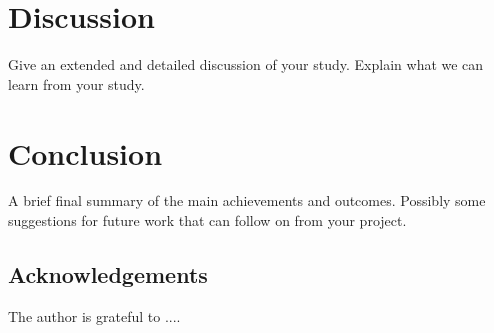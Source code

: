 \documentclass[a4,12pt]{article}
\begin{document}
\section{Discussion}
%
Give an extended and detailed discussion of your study. Explain what we can learn from your study.
%
\section{Conclusion}
%
A brief final summary of the main achievements and outcomes. Possibly some suggestions for future work that can follow on from your project.%
%
\subsection*{Acknowledgements}
The author is grateful to ....
%
\vskip 0.2in


\end{document}

